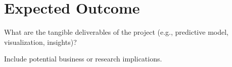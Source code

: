 \section{Expected Outcome}
What are the tangible deliverables of the project (e.g., predictive model, visualization, insights)?
    
Include potential business or research implications.